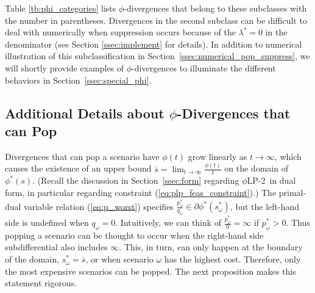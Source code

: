 \documentclass[opre,nonblindrev]{informs3} %
\newcommand{\plp}{$\phi$LP-2}
\begin{document}
Table \ref{tb:phi_categories} lists $\phi$-divergences that belong to these subclasses with the number in parentheses.
Divergences in the second subclass can be difficult to deal with numerically when suppression occurs because of the $\lambda^* = 0$ in the denominator (see Section \ref{ssec:implement} for details).
In addition to numerical illustration of this subclassification in Section~\ref{ssec:numerical_pop_suppress}, we will shortly provide examples of $\phi$-divergences to illuminate the different behaviors in Section~\ref{ssec:special_phi}. 




\subsection{Additional Details about $\phi$-Divergences that can Pop}
\label{ssec:pop}

Divergences that can pop a scenario have $\phi(t)$ grow linearly as $t \rightarrow \infty$, which causes the existence of an upper bound $\bar{s} = \lim_{t \rightarrow \infty} \frac{\phi(t)}{t}$ on the domain of $\phi^*(s)$.
(Recall the discussion in Section~\ref{ssec:form} regarding \plp\ in dual form, in particular regarding constraint (\ref{eq:plp_feas_constraint}).)
The primal-dual variable relation (\ref{eq:p_worst}) specifies $\frac{p^*_\omega}{q_\omega} \in \partial \phi^*(s^*_\omega)$, but the left-hand side is undefined when $q_\omega = 0$.
Intuitively, we can think of $\frac{p^*_\omega}{0} = \infty$ if $p^*_\omega > 0$. 
Thus popping a scenario can be thought to occur when the right-hand side subdifferential also includes $\infty$.
This, in turn, can only happen at the boundary of the domain, $s^*_\omega = \bar{s}$, or when scenario $\omega$ has the highest cost.
Therefore, only the most expensive scenarios can be popped. 
The next proposition makes this statement rigorous.
\end{document}
